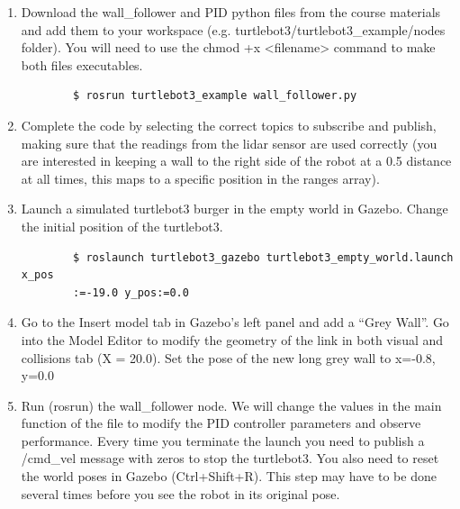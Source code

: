 \documentclass[12pt]{article}
\begin{document}
\begin{enumerate}
    \item Download the wall\_follower and PID python files from the course materials and add them to your workspace (e.g. turtlebot3/turtlebot3\_example/nodes folder). You will need to use the chmod +x <filename> command to make both files executables.
    \begin{verbatim}
        $ rosrun turtlebot3_example wall_follower.py
    \end{verbatim}
    
    \item Complete the code by selecting the correct topics to subscribe and publish, making sure that the readings from the lidar sensor are used correctly (you are interested in keeping a wall to the right side of the robot at a 0.5 distance at all times, this maps to a specific position in the ranges array).
    
    \item Launch a simulated turtlebot3 burger in the empty world in Gazebo. Change the initial position of the turtlebot3.
    \begin{verbatim}
        $ roslaunch turtlebot3_gazebo turtlebot3_empty_world.launch x_pos
        :=-19.0 y_pos:=0.0
    \end{verbatim}
    
    \item Go to the Insert model tab in Gazebo’s left panel and add a “Grey Wall”. Go into the Model Editor to modify the geometry of the link in both visual and collisions tab (X = 20.0). Set the pose of the new long grey wall to x=-0.8, y=0.0
    
    \item Run (rosrun) the wall\_follower node. We will change the values in the main function of the file to modify the PID controller parameters and observe performance. Every time you terminate the launch you need to publish a /cmd\_vel message with zeros to stop the turtlebot3. You also need to reset the world poses in Gazebo (Ctrl+Shift+R). This step may have to be done several times before you see the robot in its original pose.
    
    
\end{enumerate}
\end{document}

